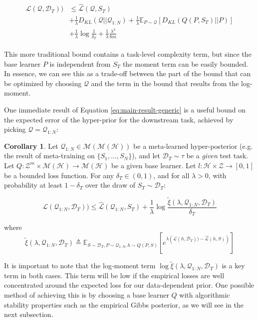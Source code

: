 \documentclass{article}
\theoremstyle{definition}
\newtheorem{corollary}{Corollary}[section]
\newcommand{\Expect}[2]{\mathbb{E}_{#1}\left [#2 \right ]}
\begin{document}
\begin{align*}
\begin{split}
\mathcal{L}(\mathcal{Q}, \mathcal{D}_T)) &\leq \hat{\mathcal{L}}(\mathcal{Q}, S_T) \\
&+ \frac{1}{\lambda}D_{KL}(\mathcal{Q}||\mathcal{Q}_{1:N}) + \frac{1}{\lambda}\Expect{P\sim \mathcal{Q}}{D_{KL}(Q(P,S_T)||P)}\\
&+\frac{1}{\lambda}\log\frac{1}{\delta_T}+\frac{1}{\lambda}\frac{\lambda^2}{8m}
\end{split}
\end{align*}

This more traditional bound contains a task-level complexity term, but since the base learner $P$ is independent from $S_T$ the moment term can be easily bounded. In essence, we can see this as a trade-off between the part of the bound that can be optimized by choosing $\mathcal{Q}$ and the term in the bound that results from the log-moment.

One immediate result of Equation \ref{eq:main-result-generic} is a useful bound on the expected error of the hyper-prior for the downstream task, achieved by picking $\mathcal{Q}=\mathcal{Q}_{1:N}$:

\begin{corollary} \label{thm:corollary-base}
	Let $\mathcal{Q}_{1:N}\in \mathcal{M}(\mathcal{M}(\mathcal{H}))$ be a meta-learned hyper-posterior (e.g. the result of meta-training on $\{S_1,...,S_N\}$), and let $\mathcal{D}_T\sim \tau$ be a \emph{given} test task. Let $Q: \mathcal{Z}^m\times\mathcal{M}(\mathcal{H})\rightarrow \mathcal{M}(\mathcal{H})$ be a given base learner. Let $l: \mathcal{H}\times \mathcal{Z}\rightarrow [0, 1]$ be a bounded loss function.
	For any $\delta_T \in (0,1)$, and for all $\lambda>0$, with probability at least $1-\delta_T$ over the draw of $S_T\sim \mathcal{D}_T$:
	
	$$\mathcal{L}(\mathcal{Q}_{1:N}, \mathcal{D}_T)) \leq \hat{\mathcal{L}}(\mathcal{Q}_{1:N}, S_T)
	+\frac{1}{\lambda}\log\frac{\tilde{\xi}(\lambda,\mathcal{Q}_{1:N},\mathcal{D}_T)}{\delta_T}$$
	
	where 
	$$\tilde{\xi}(\lambda,\mathcal{Q}_{1:N},\mathcal{D}_T)\triangleq \Expect{S\sim \mathcal{D}_T, P\sim \mathcal{Q}_{1:N}, h\sim Q(P,S)}{e^{\lambda\left (\mathcal{L}(h, \mathcal{D}_T))-\hat{\mathcal{L}}(h, S)\right )}}$$
\end{corollary}

It is important to note that the log-moment term $\log\tilde{\xi}(\lambda,\mathcal{Q}_{1:N},\mathcal{D}_T)$ is a key term in both cases. This term will be low if the empirical losses are well concentrated around the expected loss for our data-dependent prior. One possible method of achieving this is by choosing a base learner $Q$ with algorithmic stability properties such as the empirical Gibbs posterior, as we will see in the next subsection.
\end{document}
